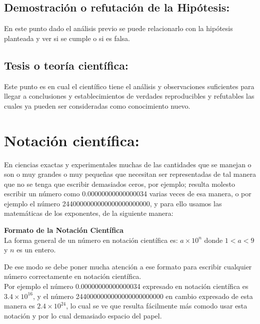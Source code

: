 \subsection{Demostración o refutación de la Hipótesis:}

En este punto dado el análisis previo se puede relacionarlo con la hipótesis planteada y ver si se cumple o si es falsa.

\subsection{Tesis o teoría científica:}

Este punto es en cual el científico tiene el análisis y observaciones suficientes para llegar a conclusiones y establecimientos 
de 
verdades reproducibles y refutables las cuales ya pueden ser consideradas como conocimiento nuevo. 

\section{Notación científica:}

En ciencias exactas y experimentales muchas de las cantidades que se manejan o son o muy grandes o muy pequeñas que 
necesitan ser representadas de tal manera que no se tenga que escribir demasiados ceros, por ejemplo; resulta molesto escribir un 
número como 0.00000000000000034 varias veces de esa manera, o por ejemplo el número 2440000000000000000000000, y para ello usamos 
las matemáticas de los exponentes, de 
la siguiente manera:

\begin{tcolorbox}
\textbf{Formato de la Notación Científica}\\

La forma general de un número en notación científica es: $a\times 10^n$ donde $1<a<9$ y $n$ es un entero.\\
\end{tcolorbox}


De ese modo se debe poner mucha atención a ese formato para escribir cualquier número correctamente en notación científica.\\

Por ejemplo el número 0.00000000000000034 expresado en notación científica es $3.4\times10^{16}$, y el número 
2440000000000000000000000 en cambio expresado de esta manera es $2.4\times10^{24}$, lo cual se ve que resulta fácilmente más 
comodo usar esta notación y por lo cual demasiado espacio del 
papel.\\

